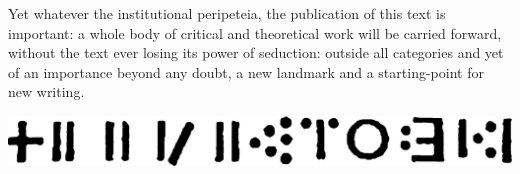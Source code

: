 \documentclass[10pt,twoside]{memoir}
\begin{document}
Yet whatever the institutional peripeteia, the publication of this text is important: a whole body
of critical and theoretical work will be carried forward, without the text ever losing its power of
seduction: outside all categories and yet of an importance beyond any doubt, a new landmark and a
starting-point for new writing.


\mainmatter

\clearpage
\pagestyle{simple}

\thispagestyle{empty}
{\centering \includegraphics{img/edensymbols.png} \par}




% 
\end{document}
